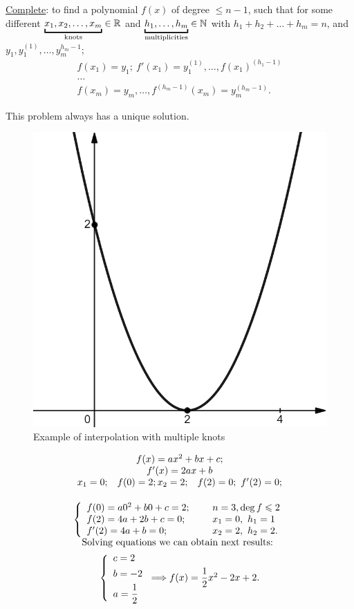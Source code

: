 \underline{Complete}: to find a polynomial $f(x)$ of degree $\leq n-1$, such that for some different $\underbracket{x_1, x_2, \ldots, x_m}_{\text{knots}} \in \R$ and $\underbracket{h_1, \ldots, h_m}_{\text{multiplicities}} \in \N$ with $h_1 + h_2 + \ldots + h_m = n$, and $y_1, y_1^{(1)}, \ldots, y_m^{h_m-1}$;
\[
    \begin{array}{c}
        f(x_1) = y_1; \ f'(x_1) = y_1^{(1)}, \ldots, f(x_1)^{(h_1-1)} \\
        \ldots \\
        f(x_m) = y_m, \ldots, f^{(h_m-1)}(x_m) = y_m^{(h_m-1)}.
    \end{array}  
\]
\begin{proposition}{}{}
    This problem always has a unique solution.
\end{proposition}
\begin{figure}
    \includegraphics[height=0.3\columnwidth, width=0.32\columnwidth]{./lectures/images/interpolation_with_multiple_knots.png}
    \caption*{Example of interpolation with multiple knots}
\end{figure}
\Ex

\[
    \begin{array}{c}
        f(x) = ax^2 + bx + c;\\
        f'(x) = 2ax + b\\
        x_1 = 0; \hspace*{0.3cm} f(0) = 2;
        x_2 = 2; \hspace*{0.3cm} f(2) = 0; \ f'(2) = 0; \\ [0.5cm]
        \left\{\begin{array}{ll} 
            f(0) = a 0^2 + b 0 + c = 2; \hspace*{0.5cm} & n=3, \deg f \leq 2 \\
            f(2) = 4a + 2b + c = 0; \hspace*{0.5cm} & x_1 = 0,\ h_1 = 1\\
            f'(2) = 4a + b = 0; \hspace*{0.5cm} & x_2 = 2, \ h_2 = 2.
        \end{array}  
        \right. \\[0.25cm]
        \text{Solving equations we can obtain next results: }\\[0.15cm]
        \left\{\begin{array}{l}
            c = 2\\[0.15cm]
            b = -2\\[0.15cm]
            a = \dfrac{1}{2}
        \end{array} \right. \Longrightarrow f(x) = \dfrac{1}{2}x^2 - 2x + 2.
    \end{array}  
\]
\vspace*{0.15cm}

